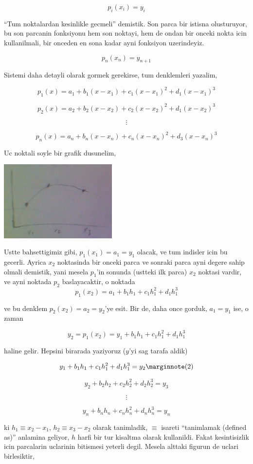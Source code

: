 \documentclass[12pt,fleqn]{article}\usepackage{../common}
\begin{document}
$$ p_i(x_i) = y_i $$

``Tum noktalardan kesinlikle gecmeli'' demistik. Son parca bir istisna
olusturuyor, bu son parcanin fonksiyonu hem son noktayi, hem de ondan bir
onceki nokta icin kullanilmali, bir onceden en sona kadar ayni fonksiyon
uzerindeyiz. 

$$ p_{n}(x_n) = y_{n+1} $$

Sistemi daha detayli olarak gormek gerekirse, tum denklemleri yazalim,

$$ p_1(x)  = a_1 + b_1(x-x_1) + c_1(x-x_1)^2 + d_1(x-x_1)^3$$

$$ p_2(x)  = a_2 + b_2(x-x_2) + c_2(x-x_2)^2 + d_1(x-x_2)^3$$

$$ \vdots $$

$$ p_n(x)  = a_n + b_n(x-x_n) + c_n(x-x_n)^2 + d_3(x-x_n)^3$$

Uc noktali soyle bir grafik dusunelim,

\includegraphics[height=4cm]{spline2.png}

Ustte bahsettigimiz gibi, $p_1(x_1) = a_1 = y_1$ olacak, ve tum indisler
icin bu gecerli. Ayrica $x_2$ noktasinda bir onceki parca ve sonraki parca
ayni degere sahip olmali demistik, yani mesela $p_1$'in sonunda (ustteki
ilk parca) $x_2$ noktasi vardir, ve ayni noktada $p_2$ baslayacaktir, o
noktada 
$$ p_1(x_2) = a_1 + b_1h_1 + c_1h_1^2 + d_1h_1^3  $$

ve bu denklem $p_2(x_2) = a_2 = y_2$'ye esit. Bir de, daha once gorduk, $a_1 =
y_1$ 
ise, o zaman 

$$ y_2 = p_1(x_2) = y_1 + b_1h_1 + c_1h_1^2 + d_1h_1^3 $$

haline gelir. Hepsini birarada yaziyoruz ($y$'yi sag tarafa aldik)

$$ y_1 + b_1h_1 + c_1h_1^2 + d_1h_1^3 = y_2 
\mlabel{2} 
$$

$$ y_2 + b_2h_2 + c_2h_2^2 + d_2h_2^3 = y_3 $$

$$ \vdots $$

$$ y_n + b_nh_n + c_nh_n^2 + d_nh_n^3 = y_n $$

ki $h_1 \equiv x_2 - x_1$, $h_2 \equiv x_3 - x_2$ olarak tanimladik,
$\equiv$ isareti ``tanimlamak (defined as)'' anlamina geliyor, $h$
harfi bir tur kisaltma olarak kullanildi. Fakat kesintisizlik icin
parcalarin uclarinin bitismesi yeterli degil. Mesela alttaki figurun de
uclari birlesiktir,
\end{document}
